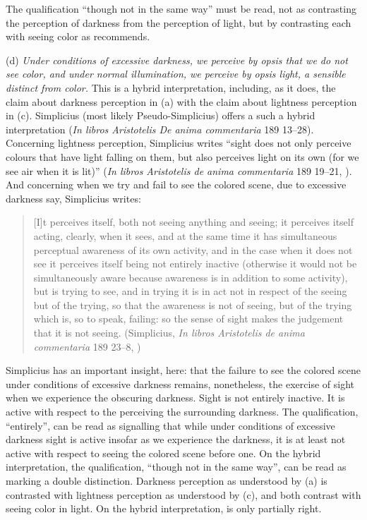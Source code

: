 The qualification ``though not in the same way'' must be read, not as contrasting the perception of darkness from the perception of light, but by contrasting each with seeing color as \citet[275]{Ross:1961uq} recommends.

(d) \emph{Under conditions of excessive darkness, we perceive by \emph{opsis} that we do not see color, and under normal illumination, we perceive by \emph{opsis} light, a sensible distinct from color.} This is a hybrid interpretation, including, as it does, the claim about darkness perception in (a) with the claim about lightness perception in (c). Simplicius (most likely Pseudo-Simplicius) offers a such a hybrid interpretation (\emph{In libros Aristotelis De anima commentaria} 189 13–28). Concerning lightness perception, Simplicius writes ``sight does not only perceive colours that have light falling on them, but also perceives light on its own (for we see air when it is lit)'' (\emph{In libros Aristotelis de anima commentaria} 189 19–21, \citealt[42]{Blumenthal:2000rf}). And concerning when we try and fail to see the colored scene, due to excessive darkness say, Simplicius writes:
\begin{quote}
	[I]t perceives itself, both not seeing anything and seeing; it perceives itself acting, clearly, when it sees, and at the same time it has simultaneous perceptual awareness of its own activity, and in the case when it does not see it perceives itself being not entirely inactive (otherwise it would not be simultaneously aware because awareness is in addition to some activity), but is trying to see, and in trying it is in act not in respect of the seeing but of the trying, so that the awareness is not of seeing, but of the trying which is, so to speak, failing: so the sense of sight makes the judgement that it is not seeing. (Simplicius, \emph{In libros Aristotelis de anima commentaria} 189 23–8, \citealt[42]{Blumenthal:2000rf})
\end{quote}
Simplicius has an important insight, here: that the failure to see the colored scene under conditions of excessive darkness remains, nonetheless, the exercise of sight when we experience the obscuring darkness. Sight is not entirely inactive. It is active with respect to the perceiving the surrounding darkness. The qualification, ``entirely'', can be read as signalling that while under conditions of excessive darkness sight is active insofar as we experience the darkness, it is at least not active with respect to seeing the colored scene before one. On the hybrid interpretation, the qualification, ``though not in the same way'', can be read as marking a double distinction. Darkness perception as understood by (a) is contrasted with lightness perception as understood by (c), and both contrast with seeing color in light. On the hybrid interpretation, \citet[275]{Ross:1961uq} is only partially right.

